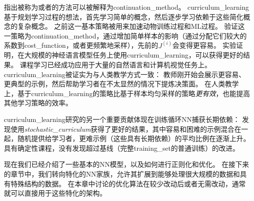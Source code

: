 \cite{Bengio+al-2009}指出被称为或者的方法可以被解释为\gls{continuation_method}。
\gls{curriculum_learning}基于规划学习过程的想法，首先学习简单的概念，然后逐步学习依赖于这些简化概念的复杂概念。
之前这一基本策略被用来加速动物训练过程\citep{Skinner1958,Peterson2004,Krueger+Dayan-2009}和\gls{ML}过程\citep{solomonoff1989system,Elman93,Sanger-1994}。
\cite{Bengio+al-2009}验证这一策略为\gls{continuation_method}，通过增加简单样本的影响（通过分配它们较大的系数到\gls{cost_function}，或者更频繁地采样），先前的$J^{(i)}$会变得更容易。
实验证明，在大规模的神经语言模型任务上使用\gls{curriculum_learning}，可以获得更好的结果。
课程学习已经成功应用于大量的自然语言\citep{Spitkovsky-et-al-HLT2010,collobert2011natural,Mikolov-ASRU-2011,Tu+Honavar-IJCAI2011}和计算机视觉\citep{Kumar+al-2010,Lee+Grauman-CVPR2011,Supancic+Ramanan-CVPR2013}任务上。
\gls{curriculum_learning}被证实为与人类教学方式一致\citep{Khan+Zhu+Mutlu-2011}：
教师刚开始会展示更容易、更典型的示例，然后帮助学习者在不太显然的情况下提炼决策面。
在人类教学上，基于\gls{curriculum_learning}的策略比基于样本均匀采样的策略\emph{更有效}，也能提高其他学习策略的效率\citep{Basu+Christensen-AAAI2013}。


\gls{curriculum_learning}研究的另一个重要贡献体现在训练循环\gls{NN}捕获长期依赖：
\cite{Zaremba+Sutskever-arxiv2014}发现使用\emph{\gls{stochastic_curriculum}}获得了更好的结果，其中容易和困难的示例混合在一起，随机提供给学习者，更难示例（这些具有长期依赖）的平均比例在逐渐上升。
具有确定性课程，没有发现超过基线（完整\gls{training_set}的普通训练）的改进。

现在我们已经介绍了一些基本的\gls{NN}模型，以及如何进行正则化和优化。
在接下来的章节中，我们转向特化的\gls{NN}家族，允许其扩展到能够处理很大规模的数据和具有特殊结构的数据。
在本章中讨论的优化算法在较少改动后或者无需改动，通常就可以直接用于这些特化的架构。

